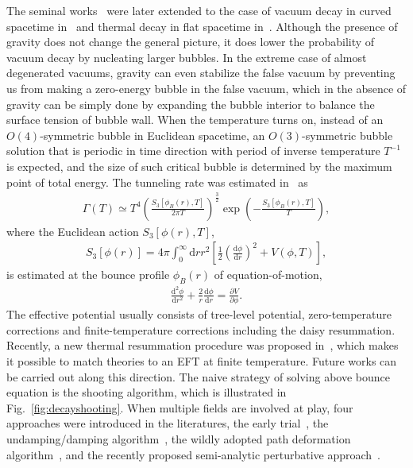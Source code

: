 \documentclass[a4paper,11pt]{article}
\begin{document}
The seminal works~\cite{Coleman:1977py,Callan:1977pt} were later extended to the case of vacuum decay in curved spacetime in~\cite{Coleman:1980aw} and thermal decay in flat spacetime in~\cite{Linde:1981zj}. Although the presence of gravity does not change the general picture, it does lower the probability of vacuum decay by nucleating larger bubbles. In the extreme case of almost degenerated vacuums, gravity can even stabilize the false vacuum by preventing us from making a zero-energy bubble in the false vacuum, which in the absence of gravity can be simply done by expanding the bubble interior to balance the surface tension of bubble wall. When the temperature turns on, instead of an $O(4)$-symmetric bubble in Euclidean spacetime, an $O(3)$-symmetric bubble solution that is periodic in time direction with period of inverse temperature $T^{-1}$ is expected, and the size of such critical bubble is determined by the maximum point of total energy. The tunneling rate was estimated in~\cite{Linde:1980tt,Linde:1981zj} as
\begin{align}
\Gamma(T)\simeq T^4\left(\frac{S_3[\phi_B(r),T]}{2\pi T}\right)^\frac32 \exp\left(-\frac{S_3[\phi_B(r),T]}{T}\right),
\end{align}
where the Euclidean action $S_3[\phi(r),T]$,
\begin{align}
S_3[\phi(r)]=4\pi\int_0^\infty\mathrm{d}r r^2\left[\frac12\left(\frac{\mathrm{d}\phi}{\mathrm{d}r}\right)^2+V(\phi,T)\right],
\end{align}
is estimated at the bounce profile $\phi_B(r)$ of equation-of-motion,
\begin{align}
\frac{\mathrm{d}^2\phi}{\mathrm{d}r^2}+\frac{2}{r}\frac{\mathrm{d}\phi}{\mathrm{d}r}=\frac{\partial V}{\partial\phi}.
\end{align}
The effective potential usually consists of tree-level potential, zero-temperature corrections and finite-temperature corrections including the daisy resummation. Recently, a new thermal resummation procedure was proposed in~\cite{Curtin:2016urg}, which makes it possible to match theories to an EFT at finite temperature. Future works can be carried out along this direction. The naive strategy of solving above bounce equation is the shooting algorithm, which is illustrated in  Fig.~\ref{fig:decayshooting}. When multiple fields are involved at play, four approaches were introduced in the literatures, the early trial~\cite{John:1998ip}, the undamping/damping algorithm~\cite{numericalbounce}, the wildly adopted path deformation algorithm~\cite{Wainwright:2011kj}, and the recently proposed semi-analytic perturbative approach~\cite{Akula:2016gpl}.
\end{document}
